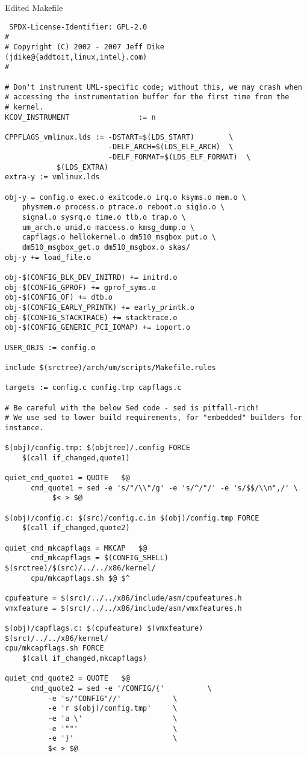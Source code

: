 \documentclass[12pt,a4paper]{report}
\begin{document}
Edited Makefile
\begin{verbatim}
 SPDX-License-Identifier: GPL-2.0
#
# Copyright (C) 2002 - 2007 Jeff Dike (jdike@{addtoit,linux,intel}.com)
#

# Don't instrument UML-specific code; without this, we may crash when
# accessing the instrumentation buffer for the first time from the
# kernel.
KCOV_INSTRUMENT                := n

CPPFLAGS_vmlinux.lds := -DSTART=$(LDS_START)		\
                        -DELF_ARCH=$(LDS_ELF_ARCH)	\
                        -DELF_FORMAT=$(LDS_ELF_FORMAT)	\
			$(LDS_EXTRA)
extra-y := vmlinux.lds

obj-y = config.o exec.o exitcode.o irq.o ksyms.o mem.o \
	physmem.o process.o ptrace.o reboot.o sigio.o \
	signal.o sysrq.o time.o tlb.o trap.o \
	um_arch.o umid.o maccess.o kmsg_dump.o \
	capflags.o hellokernel.o dm510_msgbox_put.o \
	dm510_msgbox_get.o dm510_msgbox.o skas/
obj-y += load_file.o

obj-$(CONFIG_BLK_DEV_INITRD) += initrd.o
obj-$(CONFIG_GPROF)	+= gprof_syms.o
obj-$(CONFIG_OF) += dtb.o
obj-$(CONFIG_EARLY_PRINTK) += early_printk.o
obj-$(CONFIG_STACKTRACE) += stacktrace.o
obj-$(CONFIG_GENERIC_PCI_IOMAP) += ioport.o

USER_OBJS := config.o

include $(srctree)/arch/um/scripts/Makefile.rules

targets := config.c config.tmp capflags.c

# Be careful with the below Sed code - sed is pitfall-rich!
# We use sed to lower build requirements, for "embedded" builders for instance.

$(obj)/config.tmp: $(objtree)/.config FORCE
	$(call if_changed,quote1)

quiet_cmd_quote1 = QUOTE   $@
      cmd_quote1 = sed -e 's/"/\\"/g' -e 's/^/"/' -e 's/$$/\\n",/' \
		   $< > $@

$(obj)/config.c: $(src)/config.c.in $(obj)/config.tmp FORCE
	$(call if_changed,quote2)

quiet_cmd_mkcapflags = MKCAP   $@
      cmd_mkcapflags = $(CONFIG_SHELL) $(srctree)/$(src)/../../x86/kernel/
      cpu/mkcapflags.sh $@ $^

cpufeature = $(src)/../../x86/include/asm/cpufeatures.h
vmxfeature = $(src)/../../x86/include/asm/vmxfeatures.h

$(obj)/capflags.c: $(cpufeature) $(vmxfeature) $(src)/../../x86/kernel/
cpu/mkcapflags.sh FORCE
	$(call if_changed,mkcapflags)

quiet_cmd_quote2 = QUOTE   $@
      cmd_quote2 = sed -e '/CONFIG/{'          \
		  -e 's/"CONFIG"//'            \
		  -e 'r $(obj)/config.tmp'     \
		  -e 'a \'                     \
		  -e '""'                      \
		  -e '}'                       \
		  $< > $@
\end{verbatim}
\end{document}
